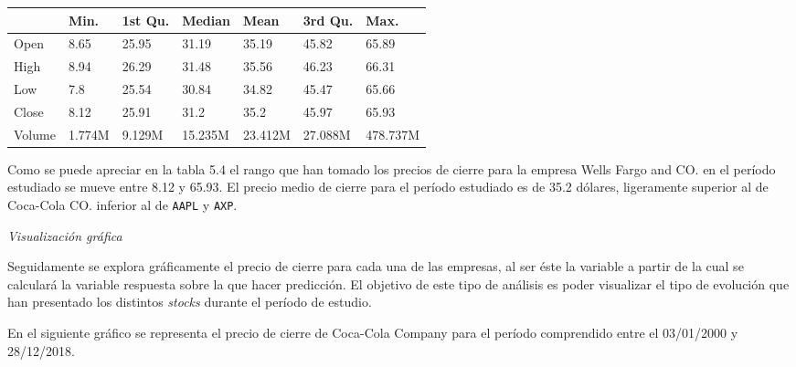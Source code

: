 \documentclass[]{article}
\newenvironment{Shaded}{\begin{snugshade}}{\end{snugshade}}
\newcommand{\DataTypeTok}[1]{\textcolor[rgb]{0.13,0.29,0.53}{#1}}
\newcommand{\KeywordTok}[1]{\textcolor[rgb]{0.13,0.29,0.53}{\textbf{#1}}}
\newcommand{\NormalTok}[1]{#1}
\newcommand{\OperatorTok}[1]{\textcolor[rgb]{0.81,0.36,0.00}{\textbf{#1}}}
\newcommand{\StringTok}[1]{\textcolor[rgb]{0.31,0.60,0.02}{#1}}
\begin{document}
\begin{table}[H]
\centering\begingroup\fontsize{10}{12}\selectfont

\begin{tabular}{l|l|l|l|l|l|l}
\hline
  & Min. & 1st Qu. & Median & Mean & 3rd Qu. & Max.\\
\hline
Open & 8.65 & 25.95 & 31.19 & 35.19 & 45.82 & 65.89\\
\hline
High & 8.94 & 26.29 & 31.48 & 35.56 & 46.23 & 66.31\\
\hline
Low & 7.8 & 25.54 & 30.84 & 34.82 & 45.47 & 65.66\\
\hline
Close & 8.12 & 25.91 & 31.2 & 35.2 & 45.97 & 65.93\\
\hline
Volume & 1.774M & 9.129M & 15.235M & 23.412M & 27.088M & 478.737M\\
\hline
\end{tabular}\endgroup{}
\end{table}

\setlength\parskip{5ex}
\justifying

Como se puede apreciar en la tabla 5.4 el rango que han tomado los
precios de cierre para la empresa Wells Fargo and CO. en el período
estudiado se mueve entre 8.12 y 65.93. El precio medio de cierre para el
período estudiado es de 35.2 dólares, ligeramente superior al de
Coca-Cola CO. inferior al de \texttt{AAPL} y \texttt{AXP}.

\emph{Visualización gráfica}

Seguidamente se explora gráficamente el precio de cierre para cada una
de las empresas, al ser éste la variable a partir de la cual se
calculará la variable respuesta sobre la que hacer predicción. El
objetivo de este tipo de análisis es poder visualizar el tipo de
evolución que han presentado los distintos \emph{stocks} durante el
período de estudio.

\setlength\parskip{5ex}
\justifying

En el siguiente gráfico se representa el precio de cierre de Coca-Cola
Company para el período comprendido entre el 03/01/2000 y 28/12/2018.

\begin{Shaded}
\end{Shaded}
\end{document}

